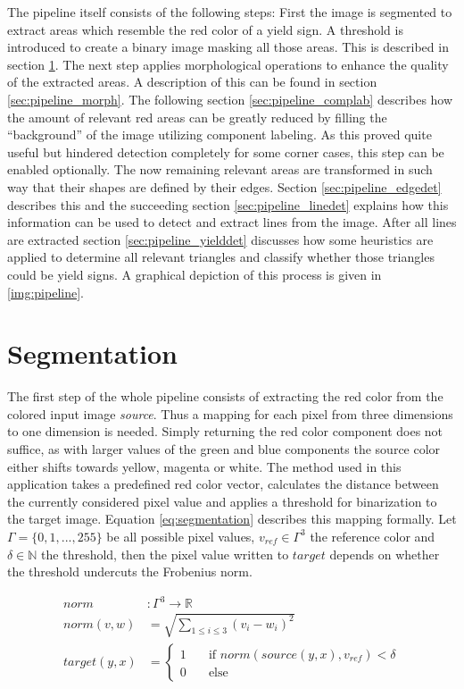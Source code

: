 \documentclass{report}
\begin{document}
The pipeline itself consists of the following steps: First the image
is segmented to extract areas which resemble the red color of a yield
sign. A threshold is introduced to create a binary image masking all
those areas. This is described in section
\ref{sec:pipeline_segmentation}. The next step applies morphological
operations to enhance the quality of the extracted areas. A
description of this can be found in section
\ref{sec:pipeline_morph}. The following section
\ref{sec:pipeline_complab} describes how the amount of relevant red
areas can be greatly reduced by filling the ``background'' of the
image utilizing component labeling. As this proved quite useful but
hindered detection completely for some corner cases, this step can be
enabled optionally. The now remaining relevant areas are transformed
in such way that their shapes are defined by their edges. Section
\ref{sec:pipeline_edgedet} describes this and the succeeding section
\ref{sec:pipeline_linedet} explains how this information can be used
to detect and extract lines from the image. After all lines are
extracted section \ref{sec:pipeline_yielddet} discusses how some
heuristics are applied to determine all relevant triangles and
classify whether those triangles could be yield signs. A graphical
depiction of this process is given in \ref{img:pipeline}.


\section{Segmentation}
\label{sec:pipeline_segmentation}

The first step of the whole pipeline consists of extracting the red
color from the colored input image \textit{source}. Thus a mapping for
each pixel from three dimensions to one dimension is needed. Simply
returning the red color component does not suffice, as with larger
values of the green and blue components the source color either shifts
towards yellow, magenta or white. The method used in this application
takes a predefined red color vector, calculates the distance between
the currently considered pixel value and applies a threshold for
binarization to the target image. Equation \ref{eq:segmentation}
describes this mapping formally. Let \( \Gamma = \{0, 1, ..., 255\} \)
be all possible pixel values, \( v_{ref} \in \Gamma^3 \) the reference
color and \( \delta \in \mathbb{N} \) the threshold, then the pixel
value written to \( target \) depends on whether the threshold
undercuts the Frobenius norm.

\begin{equation}\label{eq:segmentation}
  \begin{split}
    norm & : \Gamma^3 \to \mathbb{R} \\
    norm(v, w) & = \sqrt{\sum_{1 \leq i \leq 3}(v_i - w_i)^2}  \\
    target(y, x) & =
    \begin{cases}
      1 & \quad \text{if } norm(source(y, x), v_{ref}) < \delta \\
      0 & \quad \text{else}
    \end{cases}
  \end{split}
\end{equation}
\end{document}
